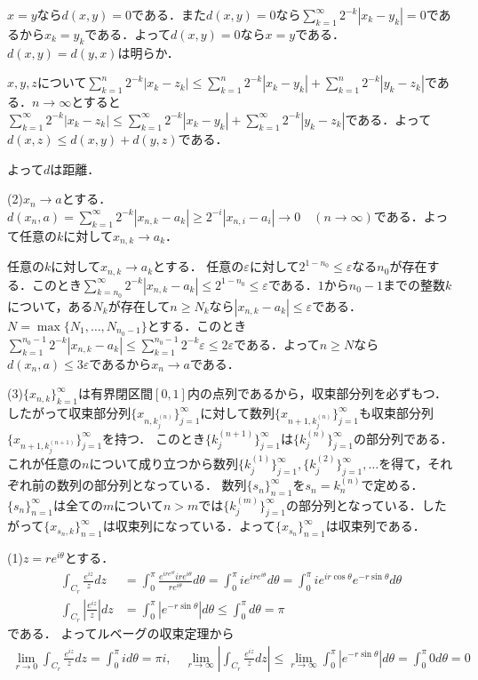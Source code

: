 \documentclass[
		book,
		head_space=20mm,
		foot_space=20mm,
		gutter=10mm,
		line_length=190mm
]{jlreq}
\begin{document}
$x=y$なら$d(x,y)=0$である．また$d(x,y)=0$なら$\sum\limits_{k=1}^\infty 2^{-k}|x_k-y_k|=0$であるから$x_k=y_k$である．よって$d(x,y)=0$なら$x=y$である．
$d(x,y)=d(y,x)$は明らか．

$x,y,z$について$\sum\limits_{k=1}^n  2^{-k}|x_k-z_k| \le \sum\limits_{k=1}^n 2^{-k} |x_k-y_k|+\sum\limits_{k=1}^n  2^{-k}|y_k-z_k|$である．$n\to\infty$とすると$\sum\limits_{k=1}^\infty  2^{-k}|x_k-z_k| \le \sum\limits_{k=1}^\infty 2^{-k} |x_k-y_k|+\sum\limits_{k=1}^\infty  2^{-k}|y_k-z_k|$である．よって$d(x,z)\le d(x,y)+d(y,z)$である．

よって$d$は距離．

(2)$x_n\rightarrow a$とする．$d(x_n,a)=\sum\limits_{k=1}^\infty 2^{-k} |x_{n,k}-a_k|\ge  2^{-i}|x_{n,i}-a_i| \rightarrow 0 \quad(n\rightarrow \infty)$である．よって任意の$k$に対して$x_{n,k}\rightarrow a_k$．

任意の$k$に対して$x_{n,k}\rightarrow a_k$とする．
任意の$\varepsilon$に対して$2^{1-n_0}\le\varepsilon$なる$n_0$が存在する．このとき$\sum\limits_{k=n_0}^\infty 2^{-k}|x_{n,k}-a_k|\le 2^{1-n_0}\le\varepsilon$である．$1$から$n_0-1$までの整数$k$について，ある$N_k$が存在して$n\ge N_k$なら$|x_{n,k}-a_k|\le \varepsilon$である．$N=\max\{N_1,\dots,N_{n_0-1}\}$とする．このとき$\sum\limits_{k=1}^{n_0-1} 2^{-k}|x_{n,k}-a_k|\le \sum\limits_{k=1}^{n_0-1} 2^{-k}\varepsilon\le2\varepsilon$である．よって$n\ge N$なら$d(x_n,a)\le 3\varepsilon$であるから$x_n\rightarrow a$である．

(3)$\{x_{n,k}\}_{k=1}^\infty$は有界閉区間$[0,1]$内の点列であるから，収束部分列を必ずもつ．
したがって収束部分列$\{x_{n,k_j^{(n)}}\}_{j=1}^\infty$に対して数列$\{ x_{n+1,k_j^{(n)}}\}_{j=1}^\infty$も収束部分列$\{x_{n+1,k_j^{(n+1)}}\}_{j=1}^\infty$を持つ．
このとき$\{k_j^{(n+1)}\}_{j=1}^\infty$は$\{k_j^{(n)}\}_{j=1}^\infty$の部分列である．
これが任意の$n$について成り立つから数列$\{k_j^{(1)}\}_{j=1}^\infty,\{k_j^{(2)}\}_{j=1}^\infty,\dots$を得て，それぞれ前の数列の部分列となっている．
数列$\{s_n\}_{n=1}^\infty$を$s_n=k_n^{(n)}$で定める．$\{s_n\}_{n=1}^\infty$は全ての$m$について$n>m$では$\{k_j^{(m)}\}_{j=1}^\infty$の部分列となっている．したがって$\{x_{s_n,k}\}_{n=1}^\infty$は収束列になっている．よって$\{x_{s_n}\}_{n=1}^\infty$は収束列である．

(1)$z=re^{i\theta}$とする．
\begin{align}
	\int_{C_r}\frac{e^{iz}}{z}dz&=\int_0^\pi \frac{e^{ire^{i\theta}}ire^{i\theta}}{re^{i\theta}}d\theta=\int_0^\pi ie^{ire^{i\theta}}d\theta=\int_0^\pi i e^{ir \cos \theta}e^{-r \sin \theta}d\theta\\
	\int_{C_r}  \left| \frac{e^{iz}}{z} \right|dz &= \int_0^\pi \left| e^{-r\sin \theta} \right|d\theta \le \int_0^\pi d\theta=\pi
\end{align}である．
よってルベーグの収束定理から
\begin{align}
	\lim_{r \to 0} \int_{C_r} \frac{e^{iz}}{z}dz=\int_0^\pi id\theta=\pi i,\quad
	\lim_{r \to \infty}  \left|\int_{C_r}\frac{e^{iz}}{z}dz\right|\le\lim_{r \to \infty}\int_0^\pi \left| e^{-r\sin \theta} \right|d\theta = \int_0^\pi0 d\theta=0
\end{align}
\end{document}
